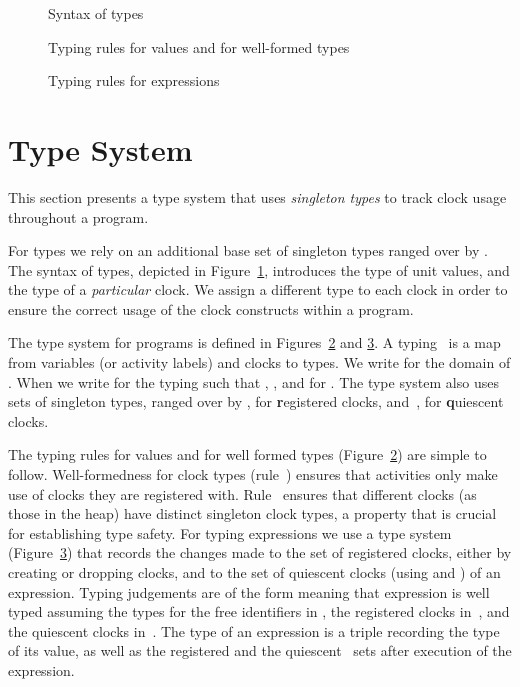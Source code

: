 \begin{figure}[t]

 \caption{Syntax of types}
  \label{fig:syn-types}
\end{figure}

 \begin{figure}[t]
 
 \caption{Typing rules for values and for well-formed types}
 \label{fig:typing-values}
\end{figure}

 \begin{figure}[t]
 
 \caption{Typing rules for expressions}
 \label{fig:typing-expressions}
\end{figure}

 
\section{Type System}
\label{sec:type-system}

This section presents a type system that uses \emph{singleton types}
to track clock usage throughout a program.



For types we rely on an additional base set of singleton types ranged
over by .
The syntax of types, depicted in Figure~\ref{fig:syn-types},
introduces the type \unitT{} of unit values, and the type  of a \emph{particular} clock. We assign a different type to
each clock in order to ensure the correct usage of the clock
constructs within a program.

The type system for \xtenclocks{} programs is defined in
Figures~\ref{fig:typing-values} and \ref{fig:typing-expressions}.
A typing~ is a map from variables (or activity labels) and
clocks to types.
We write  for the domain of . When  we write  for the typing 
such that , , and  for .
The type system also uses sets of singleton types, ranged over by
, for \textbf registered clocks, and~, for
\textbf quiescent clocks.



The typing rules for values and for well formed types
(Figure~\ref{fig:typing-values}) are simple to follow. Well-formed\-ness
for clock types (rule~\Twfc) ensures that activities only make use of
clocks they are registered with.
Rule~\TclockSeq{} ensures that different clocks (as those in the heap)
have distinct singleton clock types, a property that is crucial for
establishing type safety.
For typing expressions we use a type system
(Figure~\ref{fig:typing-expressions}) that records the changes made to
the set of registered clocks, either by creating or dropping clocks,
and to the set of quiescent clocks (using  and ) of
an expression.
Typing judgements are of the form  meaning that
expression  is well typed assuming the types for the free
identifiers in , the registered clocks in~, and
the quiescent clocks in~.
The type of an expression is a triple recording the type  of its
value, as well as the registered  and the
quiescent~ sets after execution of the expression.

